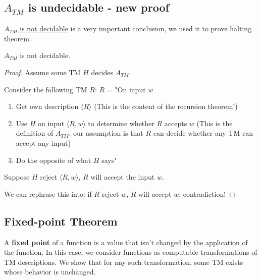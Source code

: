 \subsection{\(A_{TM}\) is undecidable - new proof}
\hyperref[theorem: A(TM) not decidable]{\(A_{TM}\) is not decidable} is a very important conclusion, we used it to prove halting theorem.

\begin{theorem}
    \(A_{TM}\) is not decidable. 
\end{theorem}
\begin{proof}
    Assume some TM \(H\) decides \(A_{TM}\). 

    Consider the following TM \(R\):
    \(R\) = "On input \(w\)
    \begin{enumerate}
        \item Get own description \(\langle R \rangle\) (This is the content of the recursion theorem!)
        \item Use \(H\) on input \(\langle R, w \rangle\)  to determine whether \(R\) accepts \(w\) (This is the definition of \(A_{TM}\), our assumption is that \(R\) can decide whether any TM can accept any input)
        \item Do the opposite of what \(H\) says"
    \end{enumerate}   

    Suppose \(H\) reject \(\langle R, w \rangle\), \(R\) will accept the input \(w\). 

    We can rephrase this into: if \(R\) reject \(w\), \(R\) will accept \(w\): contradiction!     
\end{proof}
    

\subsection{Fixed-point Theorem}
    A \textbf{fixed point} of a function is a value that isn't changed by the application of the function.  
    In this case, we consider functions as computable transformations of TM descriptions.
    We show that for any such transformation, some TM exists whose behavior is unchanged.

